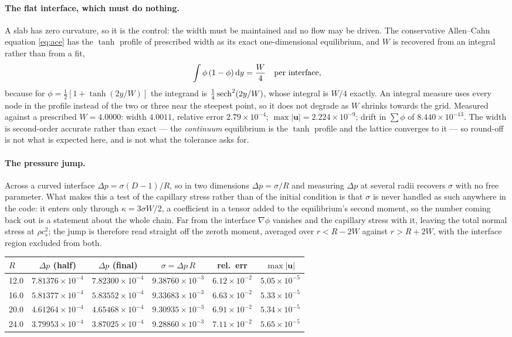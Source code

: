 \documentclass[11pt,a4paper]{article}
\newcommand{\cs}{c_s}
\newcommand{\uu}{\bm{u}}
\newcommand{\e}[1]{\times 10^{#1}}
\begin{document}
\paragraph{The flat interface, which must do nothing.} A slab has zero curvature,
so it is the control: the width must be maintained and no flow may be driven. The
conservative Allen--Cahn equation \eqref{eq:ace} has the $\tanh$ profile of
prescribed width as its exact one-dimensional equilibrium, and $W$ is recovered
from an integral rather than from a fit,
\[
  \int \phi\,(1-\phi)\,{\rm d}y = \frac{W}{4} \quad\text{per interface},
\]
because for $\phi=\tfrac12[1+\tanh(2y/W)]$ the integrand is
$\tfrac14\,{\rm sech}^2(2y/W)$, whose integral is $W/4$ exactly. An integral
measure uses every node in the profile instead of the two or three near the
steepest point, so it does not degrade as $W$ shrinks towards the grid. Measured
against a prescribed $W=4.0000$: width $4.0011$, relative error $2.79\e{-4}$;
$\max|\uu| = 2.224\e{-9}$; drift in $\sum\phi$ of $8.440\e{-13}$. The width is
second-order accurate rather than exact --- the \emph{continuum} equilibrium is
the $\tanh$ profile and the lattice converges to it --- so round-off is not what
is expected here, and is not what the tolerance asks for.

\paragraph{The pressure jump.} Across a curved interface
$\Delta p = \sigma(D-1)/R$, so in two dimensions $\Delta p = \sigma/R$ and
measuring $\Delta p$ at several radii recovers $\sigma$ with no free parameter.
What makes this a test of the capillary stress rather than of the initial
condition is that $\sigma$ is never handled as such anywhere in the code: it
enters only through $\kappa = 3\sigma W/2$, a coefficient in a tensor added to
the equilibrium's second moment, so the number coming back out is a statement
about the whole chain. Far from the interface $\nabla\phi$ vanishes and the
capillary stress with it, leaving the total normal stress at $\rho\cs^2$; the
jump is therefore read straight off the zeroth moment, averaged over $r<R-2W$
against $r>R+2W$, with the interface region excluded from both.

\begin{center}\small
\begin{tabular}{lccccc}
\toprule
$R$ & $\Delta p$ (half) & $\Delta p$ (final) & $\sigma=\Delta p\,R$ & rel.\ err & $\max|\uu|$ \\
\midrule
12.0 & $7.81376\e{-4}$ & $7.82300\e{-4}$ & $9.38760\e{-3}$ & $6.12\e{-2}$ & $5.05\e{-5}$ \\
16.0 & $5.81377\e{-4}$ & $5.83552\e{-4}$ & $9.33683\e{-3}$ & $6.63\e{-2}$ & $5.33\e{-5}$ \\
20.0 & $4.61264\e{-4}$ & $4.65468\e{-4}$ & $9.30935\e{-3}$ & $6.91\e{-2}$ & $5.34\e{-5}$ \\
24.0 & $3.79953\e{-4}$ & $3.87025\e{-4}$ & $9.28860\e{-3}$ & $7.11\e{-2}$ & $5.65\e{-5}$ \\
\bottomrule
\end{tabular}
\end{center}
\end{document}
